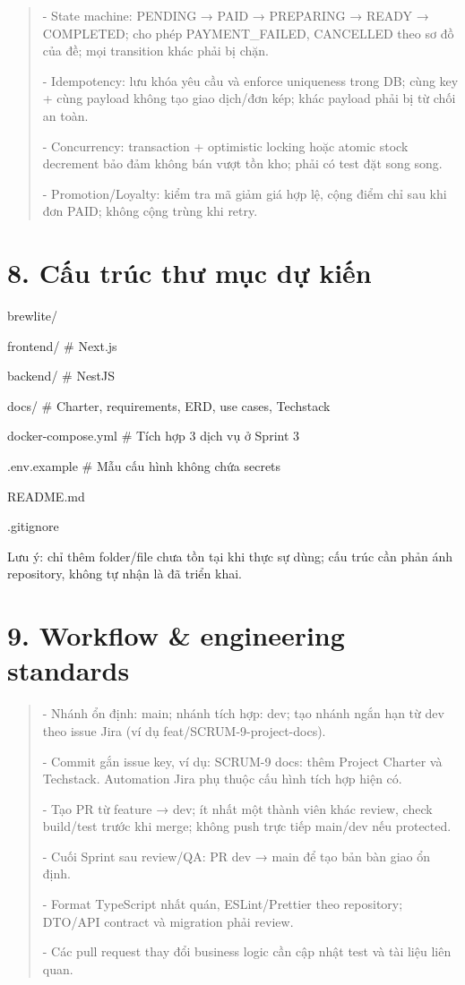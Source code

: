 \documentclass[11pt,a4paper,oneside]{report}
\begin{document}
\begin{quote}
- State machine: PENDING → PAID → PREPARING → READY → COMPLETED; cho phép PAYMENT\_FAILED, CANCELLED theo sơ đồ của đề; mọi transition khác phải bị chặn.

- Idempotency: lưu khóa yêu cầu và enforce uniqueness trong DB; cùng key + cùng payload không tạo giao dịch/đơn kép; khác payload phải bị từ chối an toàn.

- Concurrency: transaction + optimistic locking hoặc atomic stock decrement bảo đảm không bán vượt tồn kho; phải có test đặt song song.

- Promotion/Loyalty: kiểm tra mã giảm giá hợp lệ, cộng điểm chỉ sau khi đơn PAID; không cộng trùng khi retry.
\end{quote}

\section{\texorpdfstring{\textbf{8. Cấu trúc thư mục dự kiến}}{8. Cấu trúc thư mục dự kiến}}\label{05-techstack:cux1ea5u-truxfac-thux1b0-mux1ee5c-dux1ef1-kiux1ebfn}

brewlite/

frontend/ \# Next.js

backend/ \# NestJS

docs/ \# Charter, requirements, ERD, use cases, Techstack

docker-compose.yml \# Tích hợp 3 dịch vụ ở Sprint 3

.env.example \# Mẫu cấu hình không chứa secrets

README.md

.gitignore

Lưu ý: chỉ thêm folder/file chưa tồn tại khi thực sự dùng; cấu trúc cần phản ánh repository, không tự nhận là đã triển khai.

\section{\texorpdfstring{\textbf{9. Workflow \& engineering standards}}{9. Workflow \& engineering standards}}\label{05-techstack:workflow-engineering-standards}

\begin{quote}
- Nhánh ổn định: main; nhánh tích hợp: dev; tạo nhánh ngắn hạn từ dev theo issue Jira (ví dụ feat/SCRUM-9-project-docs).

- Commit gắn issue key, ví dụ: SCRUM-9 docs: thêm Project Charter và Techstack. Automation Jira phụ thuộc cấu hình tích hợp hiện có.

- Tạo PR từ feature → dev; ít nhất một thành viên khác review, check build/test trước khi merge; không push trực tiếp main/dev nếu protected.

- Cuối Sprint sau review/QA: PR dev → main để tạo bản bàn giao ổn định.

- Format TypeScript nhất quán, ESLint/Prettier theo repository; DTO/API contract và migration phải review.

- Các pull request thay đổi business logic cần cập nhật test và tài liệu liên quan.
\end{quote}
\end{document}
